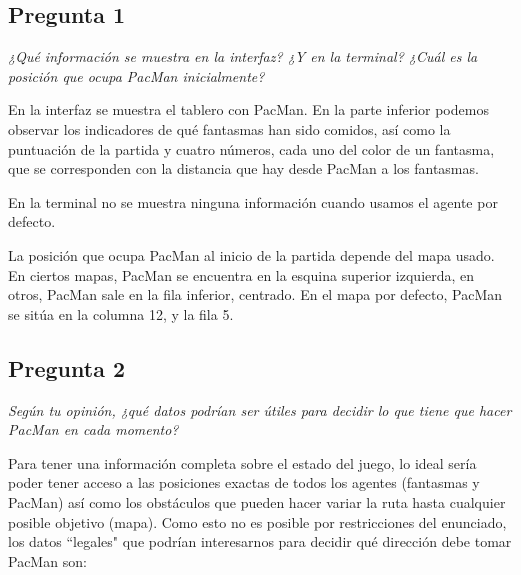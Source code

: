 \documentclass[12pt]{article}
\begin{document}
\tableofcontents

\newpage

\begin{center}

\section{Pregunta 1}

\emph{¿Qué información se muestra en la interfaz? ¿Y en la terminal? ¿Cuál es la
posición que ocupa PacMan inicialmente?}\\
\end{center}

En la interfaz se muestra el tablero con PacMan. En la parte inferior podemos
observar los indicadores de qué fantasmas han sido comidos, así como la
puntuación de la partida y cuatro números, cada uno del color de un fantasma,
que se corresponden con la distancia que hay desde PacMan a los fantasmas.

En la terminal no se muestra ninguna información cuando usamos el agente por
defecto.

La posición que ocupa PacMan al inicio de la partida depende del mapa usado.
En ciertos mapas, PacMan se encuentra en la esquina superior izquierda, en
otros, PacMan sale en la fila inferior, centrado. En el mapa por defecto,
PacMan se sitúa en la columna 12, y la fila 5.


\newpage
\begin{center}
\section{Pregunta 2}

\emph{Según tu opinión, ¿qué datos podrían ser útiles para decidir lo que tiene
que hacer PacMan en cada momento?}
\end{center}

Para tener una información completa sobre el estado del juego, lo ideal sería
poder tener acceso a las posiciones exactas de todos los agentes (fantasmas y
PacMan) así como los obstáculos que pueden hacer variar la ruta hasta cualquier
posible objetivo (mapa). Como esto no es posible por restricciones del
enunciado, los datos ``legales" que podrían interesarnos para decidir qué
dirección debe tomar PacMan son:
\end{document}
